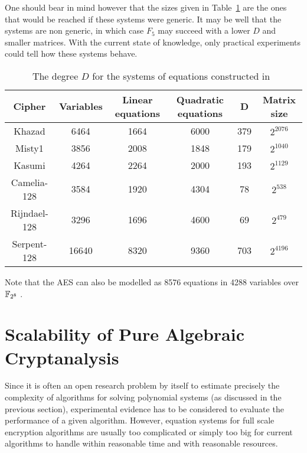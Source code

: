 One should bear in mind however that the sizes given in Table~\ref{tab:degreeD-biryukov-canniere-bardet} are the ones that would be reached if these systems were generic. It may be well that the systems are non generic, in which case $F_5$ may succeed with a lower $D$ and smaller matrices. With the current state of knowledge, only practical experiments could tell how these systems behave.

\begin{table}[htbp]
\begin{center}
\begin{tabular}{|c|c|c|c|c|c|}
\hline
Cipher & Variables & Linear equations & Quadratic equations &D& Matrix size\\
\hline
Khazad & 6464 & 1664 & 6000 & 379 & $2^{2076}$\\
\hline
Misty1 & 3856 & 2008 & 1848 & 179 & $2^{1040}$\\
\hline
Kasumi & 4264 & 2264 & 2000 & 193 & $2^{1129}$\\
\hline
Camelia-128 & 3584 & 1920 & 4304 & 78 & $2^{538}$\\
\hline
Rijndael-128 & 3296 & 1696 & 4600 & 69 & $2^{479}$\\
\hline
Serpent-128 & 16640 & 8320 & 9360 & 703 & $2^{4196}$\\
\hline
\end{tabular}
\end{center}
\caption{The degree $D$ for the systems of equations constructed
in~\cite{biryukov-canniere:fse2003}}
\label{tab:degreeD-biryukov-canniere-bardet}
\end{table}

Note that the AES can also be modelled as 8576 equations in 4288 variables  over $\mathbb{F}_{2^8}$ \cite{murphy-robshaw:crypto2002}.

\section{Scalability of Pure Algebraic Cryptanalysis}
Since it is often an open research problem by itself to estimate precisely the complexity of algorithms for solving polynomial systems (as discussed in the previous section), experimental evidence has to be considered to evaluate the performance of a given algorithm. However, equation systems for full scale encryption algorithms are usually too complicated or simply too big for current algorithms to handle within reasonable time and with reasonable resources. 

